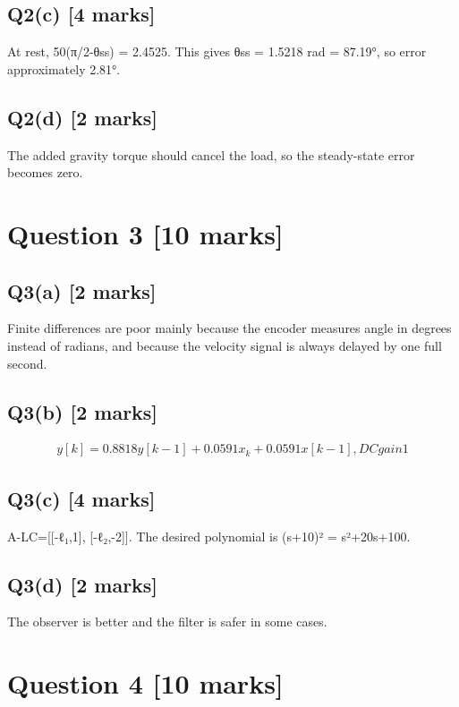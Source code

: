 \documentclass[11pt,a4paper]{article}
\begin{document}
\subsection*{Q2(c) \hfill [4 marks]}

At rest, 50(π/2-θss) = 2.4525.
This gives θss = 1.5218 rad = 87.19°, so error approximately 2.81°.

\subsection*{Q2(d) \hfill [2 marks]}

The added gravity torque should cancel the load, so the steady-state error becomes zero. 
\section*{Question 3 \hfill [10 marks]}
\subsection*{Q3(a) \hfill [2 marks]}

Finite differences are poor mainly because the encoder measures angle in degrees instead of radians, and because the velocity signal is always delayed by one full second.

\subsection*{Q3(b) \hfill [2 marks]}

\[\begin{aligned}y[k]=0.8818y[k-1]+0.0591x_k+0.0591x[k-1], DC gain 1\end{aligned}\]

\subsection*{Q3(c) \hfill [4 marks]}

A-LC=[[-ℓ₁,1], [-ℓ₂,-2]].
The desired polynomial is (s+10)² = s²+20s+100.

\subsection*{Q3(d) \hfill [2 marks]}

The observer is better and the filter is safer in some cases.

\section*{Question 4 \hfill [10 marks]}
\end{document}
